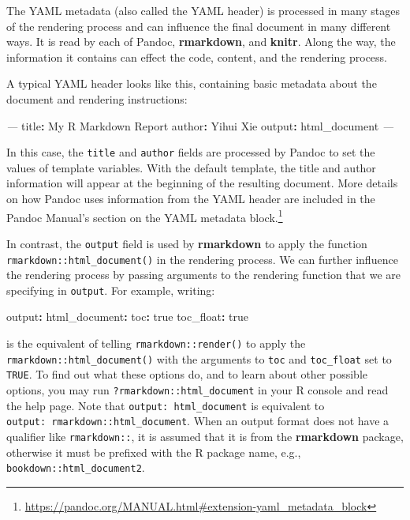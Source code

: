 \documentclass[
  11pt,
]{krantz}
\newenvironment{Shaded}{\begin{snugshade}}{\end{snugshade}}
\newcommand{\AttributeTok}[1]{\textcolor[rgb]{0.61,0.61,0.61}{#1}}
\newcommand{\CharTok}[1]{\textcolor[rgb]{0.5,0.5,0.5}{#1}}
\newcommand{\FunctionTok}[1]{\textcolor[rgb]{0,0,0}{#1}}
\newcommand{\KeywordTok}[1]{\textcolor[rgb]{0.27,0.27,0.27}{\textbf{#1}}}
\newcommand{\PreprocessorTok}[1]{\textcolor[rgb]{0.37,0.37,0.37}{\textit{#1}}}
\renewcommand{\href}[2]{#2\footnote{\url{#1}}}
\begin{document}
The YAML metadata (also called the YAML header) is processed in many stages of the rendering process and can influence the final document in many different ways. It is read by each of Pandoc, \textbf{rmarkdown}, and \textbf{knitr}. Along the way, the information it contains can effect the code, content, and the rendering process.

A typical YAML header looks like this, containing basic metadata about the document and rendering instructions:

\begin{Shaded}
\begin{Highlighting}[]
\PreprocessorTok{---}
\FunctionTok{title}\KeywordTok{:}\AttributeTok{ My R Markdown Report}
\FunctionTok{author}\KeywordTok{:}\AttributeTok{ Yihui Xie}
\FunctionTok{output}\KeywordTok{:}\AttributeTok{ html_document}
\PreprocessorTok{---}
\end{Highlighting}
\end{Shaded}

In this case, the \texttt{title} and \texttt{author} fields are processed by Pandoc to set the values of template variables. With the default template, the title and author information will appear at the beginning of the resulting document. More details on how Pandoc uses information from the YAML header are included in the Pandoc Manual's section on the \href{https://pandoc.org/MANUAL.html\#extension-yaml_metadata_block}{YAML metadata block.}

In contrast, the \texttt{output} field is used by \textbf{rmarkdown} to apply the function \texttt{rmarkdown::html\_document()} in the rendering process. We can further influence the rendering process by passing arguments to the rendering function that we are specifying in \texttt{output}. For example, writing:

\begin{Shaded}
\begin{Highlighting}[]
\FunctionTok{output}\KeywordTok{:}
\AttributeTok{  }\FunctionTok{html_document}\KeywordTok{:}
\AttributeTok{    }\FunctionTok{toc}\KeywordTok{:}\AttributeTok{ }\CharTok{true}
\AttributeTok{    }\FunctionTok{toc_float}\KeywordTok{:}\AttributeTok{ }\CharTok{true}
\end{Highlighting}
\end{Shaded}

is the equivalent of telling \texttt{rmarkdown::render()} to apply the \texttt{rmarkdown::html\_document()} with the arguments to \texttt{toc} and \texttt{toc\_float} set to \texttt{TRUE}. To find out what these options do, and to learn about other possible options, you may run \texttt{?rmarkdown::html\_document} in your R console and read the help page. Note that \texttt{output:\ html\_document} is equivalent to \texttt{output:\ rmarkdown::html\_document}. When an output format does not have a qualifier like \texttt{rmarkdown::}, it is assumed that it is from the \textbf{rmarkdown} package, otherwise it must be prefixed with the R package name, e.g., \texttt{bookdown::html\_document2}.
\end{document}
